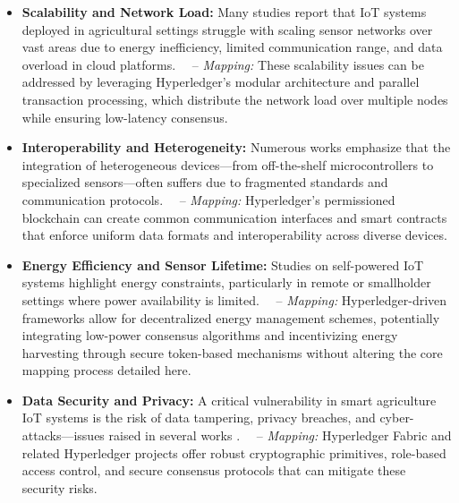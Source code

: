 \documentclass[12pt,onecolumn]{IEEEtran} %
\begin{document}
\begin{itemize}
\item \textbf{Scalability and Network Load:} Many studies \cite{atalla2023iotenabledprecisionagriculture, bayih2022utilizationofinternet, bayih2022utilizationofinternet} report that IoT systems deployed in agricultural settings struggle with scaling sensor networks over vast areas due to energy inefficiency, limited communication range, and data overload in cloud platforms.  
 – \textit{Mapping:} These scalability issues can be addressed by leveraging Hyperledger’s modular architecture and parallel transaction processing, which distribute the network load over multiple nodes while ensuring low-latency consensus.

\item \textbf{Interoperability and Heterogeneity:} Numerous works \cite{bayih2022utilizationofinternet, bayih2022utilizationofinternet, bayih2022utilizationofinternet} emphasize that the integration of heterogeneous devices—from off-the-shelf microcontrollers to specialized sensors—often suffers due to fragmented standards and communication protocols.  
 – \textit{Mapping:} Hyperledger’s permissioned blockchain can create common communication interfaces and smart contracts that enforce uniform data formats and interoperability across diverse devices.

\item \textbf{Energy Efficiency and Sensor Lifetime:} Studies on self-powered IoT systems \cite{raju2022aselfpoweredrealtime, bayih2022utilizationofinternet} highlight energy constraints, particularly in remote or smallholder settings where power availability is limited.  
 – \textit{Mapping:} Hyperledger-driven frameworks allow for decentralized energy management schemes, potentially integrating low-power consensus algorithms and incentivizing energy harvesting through secure token-based mechanisms without altering the core mapping process detailed here.

\item \textbf{Data Security and Privacy:} A critical vulnerability in smart agriculture IoT systems is the risk of data tampering, privacy breaches, and cyber-attacks—issues raised in several works \cite{abunadi2022trafficawaresecuredcooperative, rahaman2024privacycentricaiand, ouafiq2022datamanagementand}.  
 – \textit{Mapping:} Hyperledger Fabric and related Hyperledger projects offer robust cryptographic primitives, role-based access control, and secure consensus protocols that can mitigate these security risks.


\end{itemize}
\end{document}
